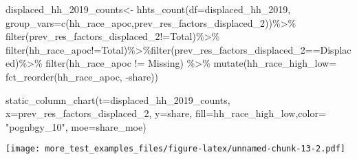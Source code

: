 \documentclass[
]{article}
\newenvironment{Shaded}{\begin{snugshade}}{\end{snugshade}}
\newcommand{\AttributeTok}[1]{\textcolor[rgb]{0.77,0.63,0.00}{#1}}
\newcommand{\FunctionTok}[1]{\textcolor[rgb]{0.00,0.00,0.00}{#1}}
\newcommand{\NormalTok}[1]{#1}
\newcommand{\OtherTok}[1]{\textcolor[rgb]{0.56,0.35,0.01}{#1}}
\newcommand{\SpecialCharTok}[1]{\textcolor[rgb]{0.00,0.00,0.00}{#1}}
\newcommand{\StringTok}[1]{\textcolor[rgb]{0.31,0.60,0.02}{#1}}
\begin{document}
\begin{Shaded}
\begin{Highlighting}[]
\NormalTok{displaced\_hh\_2019\_counts}\OtherTok{\textless{}{-}} \FunctionTok{hhts\_count}\NormalTok{(}\AttributeTok{df=}\NormalTok{displaced\_hh\_2019, }\AttributeTok{group\_vars=}\FunctionTok{c}\NormalTok{(}\StringTok{\textquotesingle{}hh\_race\_apoc\textquotesingle{}}\NormalTok{,}\StringTok{\textquotesingle{}prev\_res\_factors\_displaced\_2\textquotesingle{}}\NormalTok{))}\SpecialCharTok{\%\textgreater{}\%}
\FunctionTok{filter}\NormalTok{(prev\_res\_factors\_displaced\_2}\SpecialCharTok{!=}\StringTok{\textquotesingle{}Total\textquotesingle{}}\NormalTok{)}\SpecialCharTok{\%\textgreater{}\%}
  \FunctionTok{filter}\NormalTok{(hh\_race\_apoc}\SpecialCharTok{!=}\StringTok{\textquotesingle{}Total\textquotesingle{}}\NormalTok{)}\SpecialCharTok{\%\textgreater{}\%}\FunctionTok{filter}\NormalTok{(prev\_res\_factors\_displaced\_2}\SpecialCharTok{==}\StringTok{\textquotesingle{}Displaced\textquotesingle{}}\NormalTok{)}\SpecialCharTok{\%\textgreater{}\%}
  \FunctionTok{filter}\NormalTok{(hh\_race\_apoc }\SpecialCharTok{!=} \StringTok{\textquotesingle{}Missing\textquotesingle{}}\NormalTok{) }\SpecialCharTok{\%\textgreater{}\%}
  \FunctionTok{mutate}\NormalTok{(}\AttributeTok{hh\_race\_high\_low=} \FunctionTok{fct\_reorder}\NormalTok{(hh\_race\_apoc, }\SpecialCharTok{{-}}\NormalTok{share))}

\FunctionTok{static\_column\_chart}\NormalTok{(}\AttributeTok{t=}\NormalTok{displaced\_hh\_2019\_counts, }\AttributeTok{x=}\StringTok{\textquotesingle{}prev\_res\_factors\_displaced\_2\textquotesingle{}}\NormalTok{, }\AttributeTok{y=}\StringTok{\textquotesingle{}share\textquotesingle{}}\NormalTok{, }\AttributeTok{fill=}\StringTok{\textquotesingle{}hh\_race\_high\_low\textquotesingle{}}\NormalTok{,}\AttributeTok{color=}  \StringTok{"pognbgy\_10"}\NormalTok{, }\AttributeTok{moe=}\StringTok{\textquotesingle{}share\_moe\textquotesingle{}}\NormalTok{)}
\end{Highlighting}
\end{Shaded}

\texttt{[image: more\_test\_examples\_files/figure-latex/unnamed-chunk-13-2.pdf]}
\end{document}
